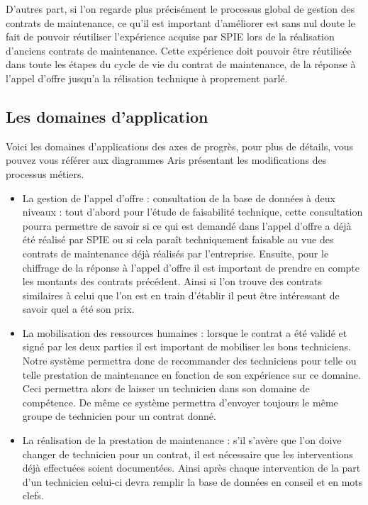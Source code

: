 D'autres part, si l'on regarde plus précisément le processus global de gestion des contrats de maintenance, ce qu'il est important d'améliorer est sans nul doute le fait de pouvoir réutiliser l'expérience acquise par SPIE lors de la réalisation d'anciens contrats de maintenance. Cette expérience doit pouvoir être réutilisée dans toute les étapes du cycle de vie du contrat de maintenance, de la réponse à l'appel d'offre jusqu'a la rélisation technique à proprement parlé.
\subsection {Les domaines d'application}
Voici les domaines d'applications des axes de progrès, pour plus de détails, vous pouvez vous référer aux diagrammes Aris présentant les modifications des processus métiers.
\begin{itemize}
\item La gestion de l'appel d'offre : consultation de la base de données à deux niveaux : tout d'abord pour l'étude de faisabilité technique, cette consultation pourra permettre de savoir si ce qui est demandé dans l'appel d'offre a déjà été réalisé par SPIE ou si cela paraît techniquement faisable au vue des contrats de maintenance déjà réalisés par l'entreprise. Ensuite, pour le chiffrage de la réponse à l'appel d'offre il est important de prendre en compte les montants des contrats précédent. Ainsi si l'on trouve des contrats similaires à celui que l'on est en train d'établir il peut être intéressant de savoir quel a été son prix.
\item La mobilisation des ressources humaines : lorsque le contrat a été validé et signé par les deux parties il est important de mobiliser les bons techniciens. Notre système permettra donc de recommander des techniciens pour telle ou telle prestation de maintenance en fonction de son expérience sur ce domaine. Ceci permettra alors de laisser un technicien dans son domaine de compétence. De même ce système permettra d'envoyer toujours le même groupe de technicien pour un contrat donné.
\item La réalisation de la prestation de maintenance : s'il s'avère que l'on doive changer de technicien pour un contrat, il est nécessaire que les interventions déjà effectuées soient documentées. Ainsi après chaque intervention de la part d'un technicien celui-ci devra remplir la base de données en conseil et en mots clefs.
\end{itemize}

